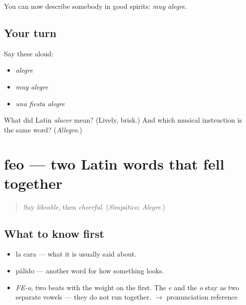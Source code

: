 \begin{grammarlens}[title={What you've built}]
You can now describe somebody in good spirits: \emph{muy alegre}.
\end{grammarlens}

\subsection*{Your turn}
Say these aloud:

\begin{itemize}
\raggedright
  \item \emph{alegre}
  \item \emph{muy alegre}
  \item \emph{una fiesta alegre}
\end{itemize}

\begin{tcolorbox}[breakable,colback=teal!4,colframe=teal!35!black,title={Before you move on}]
What did Latin \emph{alacer} mean? (Lively, brisk.) And which musical instruction is the same word? (\emph{Allegro}.)
\end{tcolorbox}
\section[feo]{feo — two Latin words that fell together}

\label{lesson:ES-C380-feo}



\begin{quote}
Say \emph{likeable}, then \emph{cheerful}. (\emph{Simpático}; \emph{Alegre}.)
\end{quote}

\subsection*{What to know first}
\begin{itemize}
\raggedright
  \item la cara — what it is usually said about.
  \item pálido — another word for how something looks.
\end{itemize}

\begin{sounds}
\begin{itemize}
\raggedright
  \item \emph{FE-o}, two beats with the weight on the first. The \emph{e} and the \emph{o} stay as two separate vowels — they do not run together. $\to$ pronunciation reference
\end{itemize}
\end{sounds}

